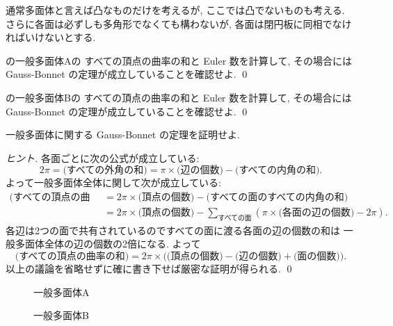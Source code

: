 \documentclass[12pt,twoside]{jarticle}
\begin{document}
通常多面体と言えば凸なものだけを考えるが, 
ここでは凸でないものも考える.
さらに各面は必ずしも多角形でなくても構わないが, 
各面は閉円板に同相でなければいけないとする.

\begin{question}
  の一般多面体Aの
  すべての頂点の曲率の和と Euler 数を計算して, 
  その場合には Gauss-Bonnet の定理が成立していることを確認せよ.
  \qed
\end{question}

\begin{question}
  の一般多面体Bの
  すべての頂点の曲率の和と Euler 数を計算して, 
  その場合には Gauss-Bonnet の定理が成立していることを確認せよ.
  \qed
\end{question}

\begin{question}
  一般多面体に関する Gauss-Bonnet の定理を証明せよ.
\end{question}

\begin{proof}[ヒント]
  各面ごとに次の公式が成立している:
  \begin{equation*}
      2\pi
    = \text{(すべての外角の和)}
    = \pi\times\text{(辺の個数)} - \text{(すべての内角の和)}.
  \end{equation*}
  よって一般多面体全体に関して次が成立している:
  \begin{align*}
    \text{(すべての頂点の曲率の和)}
    &
    = 2\pi\times\text{(頂点の個数)} - \text{(すべての面のすべての内角の和)}
    \\ &
    = 2\pi\times\text{(頂点の個数)} 
    - \sum_{\text{すべての面}}(\pi\times\text{(各面の辺の個数)} - 2\pi).
  \end{align*}
  各辺は2つの面で共有されているのですべての面に渡る各面の辺の個数の和は
  一般多面体全体の辺の個数の2倍になる. よって
  \begin{equation*}
    \text{(すべての頂点の曲率の和)}
    = 2\pi\times
    \bigl(\text{(頂点の個数)} - \text{(辺の個数)} + \text{(面の個数)}\bigr).
  \end{equation*}
  以上の議論を省略せずに確に書き下せば厳密な証明が得られる.  \qed
\end{proof}

\newpage

\begin{figure}[htbp]
  \centering
%  
  \vspace{9cm}
  \caption{一般多面体A}
  \label{fig:polyhedron01}
\end{figure}

\begin{figure}[htbp]
  \centering
%  
  \vspace{8cm}
  \caption{一般多面体B}
  \label{fig:polyhedron02}
\end{figure}

\end{document}
